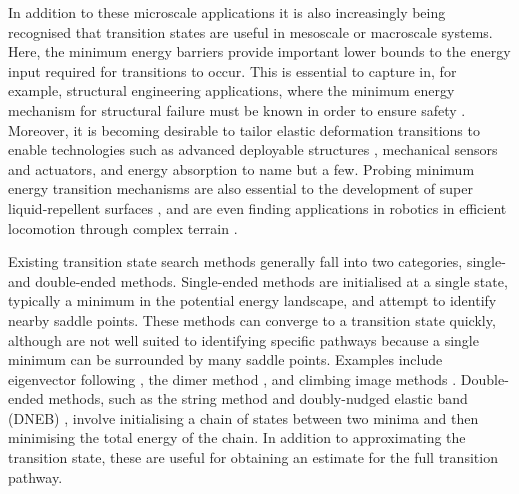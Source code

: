 \documentclass[aps,twocolumn]{revtex4-1}
\begin{document}
\topic In addition to these microscale applications it is also increasingly being recognised that transition states are useful in mesoscale or macroscale systems.
Here, the minimum energy barriers provide important lower bounds to the energy input required for transitions to occur.
This is essential to capture in, for example, structural engineering applications, where the minimum energy mechanism for structural failure must be known in order to ensure safety \cite{Panter2019,Hutchinson2018}.
Moreover, it is becoming desirable to tailor elastic deformation transitions to enable technologies such as advanced deployable structures \cite{Filipov2015,Zhai2018}, mechanical sensors and actuators, and energy absorption \cite{Shan2015} to name but a few.
Probing minimum energy transition mechanisms are also essential to the development of super liquid-repellent surfaces \cite{Zhang2014,Panter2019b}, and are even finding applications in robotics in efficient locomotion through complex terrain \cite{Othayoth2020}.

\topic Existing transition state search methods generally fall into two categories, single- and double-ended methods.
Single-ended methods are initialised at a single state, typically a minimum in the potential energy landscape, and attempt to identify nearby saddle points.
These methods can converge to a transition state quickly, although are not well suited to identifying specific pathways because a single minimum can be surrounded by many saddle points.
Examples include eigenvector following \cite{Cerjan1981}, the dimer method \cite{Heyden2005,Kastner2008}, and climbing image methods \cite{E2007,Ren2013}.
Double-ended methods, such as the string method \cite{E2002,E2007} and doubly-nudged elastic band (DNEB) \cite{Trygubenko2004}, involve initialising a chain of states between two minima and then minimising the total energy of the chain.
In addition to approximating the transition state, these are useful for obtaining an estimate for the full transition pathway.
\end{document}
